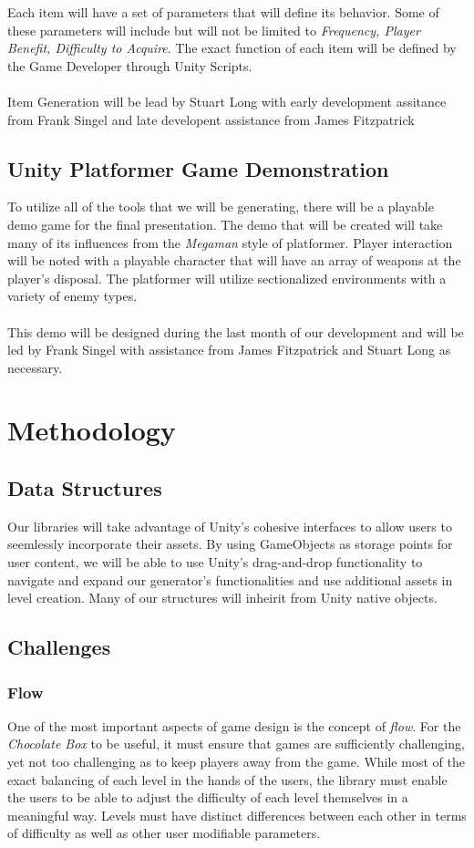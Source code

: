\documentclass[pdftex,12pt,letter]{article}
\begin{document}
\begin{itemize}
\begin{itemize}
\begin{itemize}
\endgroup

Each item will have a set of parameters that will define its behavior. Some of these parameters will include but will not be limited to \textit{Frequency, Player Benefit, Difficulty to Acquire}. The exact function of each item will be defined by the Game Developer through Unity Scripts. 
\\\\
Item Generation will be lead by Stuart Long with early development assitance from Frank Singel and late developent assistance from James Fitzpatrick

\subsection{Unity Platformer Game Demonstration}
To utilize all of the tools that we will be generating, there will be a playable demo game for the final presentation. The demo that will be created will take many of its influences from the \textit{Megaman} style of platformer.  Player interaction will be noted with a playable character that will have an array of weapons at the player's disposal. The platformer will utilize sectionalized environments with a variety of enemy types. 
\\\\
This demo will be designed during the last month of our development and will be led by Frank Singel with assistance from James Fitzpatrick and Stuart Long as necessary. 

\section{Methodology}
\subsection{Data Structures}
Our libraries will take advantage of Unity's cohesive interfaces to allow users to seemlessly incorporate their assets. By using GameObjects as storage points for user content, we will be able to use Unity's drag-and-drop functionality to navigate and expand our generator's functionalities and use additional assets in level creation. Many of our structures will inheirit from  Unity native objects.

\subsection{Challenges}
\subsubsection{Flow}
One of the most important aspects of game design is the concept of \textit{flow}.  For the \textit{Chocolate Box} to be useful, it must ensure that games are sufficiently challenging, yet not too challenging as to keep players away from the game. While most of the  exact balancing of each level in the hands of the users, the library must enable the users to be able to adjust the difficulty of each level themselves in a meaningful way. Levels must have distinct differences between each other in terms of difficulty as well as other user modifiable parameters. 

\end{itemize}
\end{itemize}
\end{itemize}
\end{document}
